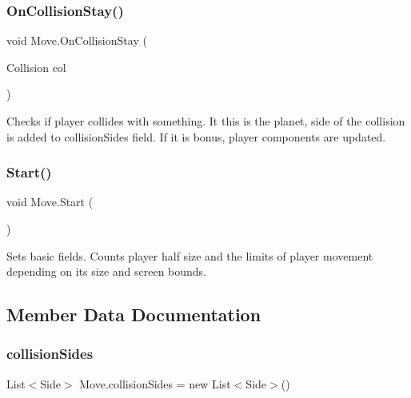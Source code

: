 \subsubsection{\texorpdfstring{On\+Collision\+Stay()}{OnCollisionStay()}}
{\footnotesize\ttfamily void Move.\+On\+Collision\+Stay (\begin{DoxyParamCaption}\item[{Collision}]{col }\end{DoxyParamCaption})\hspace{0.3cm}{\ttfamily [private]}}



Checks if player collides with something. It this is the planet, side of the collision is added to collision\+Sides field. If it is bonus, player components are updated. 

\mbox{\label{class_move_aea23c11a3be7cd82d739e051aa9a7ae2}} 
\subsubsection{\texorpdfstring{Start()}{Start()}}
{\footnotesize\ttfamily void Move.\+Start (\begin{DoxyParamCaption}{ }\end{DoxyParamCaption})\hspace{0.3cm}{\ttfamily [private]}}



Sets basic fields. Counts player half size and the limits of player movement depending on its size and screen bounds. 



\subsection{Member Data Documentation}
\mbox{\label{class_move_a727888662ad4981d5935f212174e050b}} 
\subsubsection{\texorpdfstring{collision\+Sides}{collisionSides}}
{\footnotesize\ttfamily List$<$Side$>$ Move.\+collision\+Sides = new List$<$Side$>$()\hspace{0.3cm}{\ttfamily [private]}}




